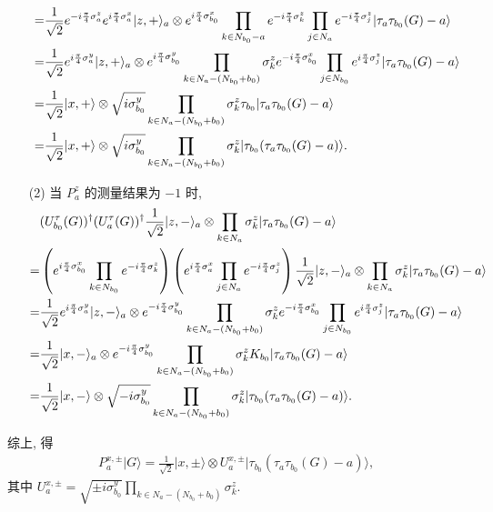 \documentclass{assignment}
\begin{document}
\begin{pf}
\begin{itemize}
\begin{align}
            \notag=&\frac{1}{\sqrt{2}}e^{-i\frac{\pi}{4}\sigma_a^z}e^{i\frac{\pi}{4}\sigma_a^x}\lvert z,+\rangle_a\otimes e^{i\frac{\pi}{4}\sigma_{b_0}^x}\prod_{k\in N_{b_0}-a}e^{-i\frac{\pi}{4}\sigma_k^z}\prod_{j\in N_a}e^{-i\frac{\pi}{4}\sigma_j^z}\lvert\tau_a\tau_{b_0}(G)-a\rangle\\
            \notag=&\frac{1}{\sqrt{2}}e^{i\frac{\pi}{4}\sigma_a^y}\lvert z,+\rangle_a\otimes e^{i\frac{\pi}{4}\sigma_{b_0}^y}\prod_{k\in N_a-(N_{b_0}+b_0)}\sigma_k^ze^{-i\frac{\pi}{4}\sigma_{b_0}^x}\prod_{j\in N_{b_0}}e^{i\frac{\pi}{4}\sigma_j^z}\lvert\tau_a\tau_{b_0}(G)-a\rangle\\
            \notag=&\frac{1}{\sqrt{2}}\lvert x,+\rangle\otimes\sqrt{i\sigma_{b_0}^y}\prod_{k\in N_a-(N_{b_0}+b_0)}\sigma_k^z\tau_{b_0}\lvert\tau_a\tau_{b_0}(G)-a\rangle\\
            =&\frac{1}{\sqrt{2}}\lvert x,+\rangle\otimes\sqrt{i\sigma_{b_0}^y}\prod_{k\in N_a-(N_{b_0}+b_0)}\sigma_k^z\lvert\tau_{b_0}(\tau_a\tau_{b_0}(G)-a)\rangle.
        \end{align}
        \item[(2)] 当 $P_a^z$ 的测量结果为 $-1$ 时,
        \begin{align}
            \notag&(U_{b_0}^{\tau}(G))^{\dagger}(U_a^{\tau}(G))^{\dagger}\frac{1}{\sqrt{2}}\lvert z,-\rangle_a\otimes\prod_{k\in N_a}\sigma_k^z\lvert\tau_a\tau_{b_0}(G)-a\rangle\\
            \notag=&\left(e^{i\frac{\pi}{4}\sigma_{b_0}^x}\prod_{k\in N_{b_0}}e^{-i\frac{\pi}{4}\sigma_k^z}\right)\left(e^{i\frac{\pi}{4}\sigma_a^x}\prod_{j\in N_a}e^{-i\frac{\pi}{4}\sigma_j^z}\right)\frac{1}{\sqrt{2}}\lvert z,-\rangle_a\otimes\prod_{k\in N_a}\sigma_k^z\lvert\tau_a\tau_{b_0}(G)-a\rangle\\
            \notag=&\frac{1}{\sqrt{2}}e^{i\frac{\pi}{4}\sigma_a^y}\lvert z,-\rangle_a\otimes e^{-i\frac{\pi}{4}\sigma_{b_0}^y}\prod_{k\in N_a-(N_{b_0}+b_0)}\sigma_k^ze^{-i\frac{\pi}{4}\sigma_{b_0}^x}\prod_{j\in N_{b_0}}e^{i\frac{\pi}{4}\sigma_j^z}\lvert\tau_a\tau_{b_0}(G)-a\rangle\\
            \notag=&\frac{1}{\sqrt{2}}\lvert x,-\rangle_a\otimes e^{-i\frac{\pi}{4}\sigma_{b_0}^y}\prod_{k\in N_a-(N_{b_0}+b_0)}\sigma_k^zK_{b_0}\lvert\tau_a\tau_{b_0}(G)-a\rangle\\
            =&\frac{1}{\sqrt{2}}\lvert x,-\rangle\otimes\sqrt{-i\sigma_{b_0}^y}\prod_{k\in N_a-(N_{b_0}+b_0)}\sigma_k^z\lvert\tau_{b_0}(\tau_a\tau_{b_0}(G)-a)\rangle.
        \end{align}
    \end{itemize}
    综上, 得
    \begin{align}
        P_a^{x,\pm}\lvert G\rangle=\frac{1}{\sqrt{2}}\lvert x,\pm\rangle\otimes U_a^{x,\pm}\lvert\tau_{b_0}(\tau_a\tau_{b_0}(G)-a)\rangle,
    \end{align}
    其中 $U_a^{x,\pm}=\sqrt{\pm i\sigma_{b_0}^y}\prod_{k\in N_a-(N_{b_0}+b_0)}\sigma_k^z$.
\end{pf}
\end{document}
